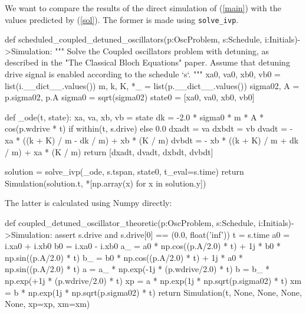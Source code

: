 We want to compare the results of the direct simulation of (\ref{main}) with the values predicted by
(\ref{sol}). The former is made using \verb|solve_ivp|.

  \begin{python}
  def scheduled_coupled_detuned_oscillators(p:OscProblem, s:Schedule, i:Initials)->Simulation:
    """ Solve the Coupled oscillators problem with detuning, as described in the "The Classical Bloch
    Equations" paper. Assume that detuning drive signal is enabled according to the schedule `s`.
    """
    xa0, va0, xb0, vb0 = list(i.__dict__.values())
    m, k, K, *_ = list(p.__dict__.values())
    sigma02, A = p.sigma02, p.A
    sigma0 = sqrt(sigma02)
    state0 = [xa0, va0, xb0, vb0]
  
    def _ode(t, state):
      xa, va, xb, vb = state
      dk = -2.0 * sigma0 * m * A * cos(p.wdrive * t) if within(t, s.drive) else 0.0
      dxadt = va
      dxbdt = vb
      dvadt = - xa * ((k + K) / m - dk / m) + xb * (K / m)
      dvbdt = - xb * ((k + K) / m + dk / m) + xa * (K / m)
      return [dxadt, dvadt, dxbdt, dvbdt]
  
    solution = solve_ivp(_ode, s.tspan, state0, t_eval=s.time)
    return Simulation(solution.t, *[np.array(x) for x in solution.y])
  \end{python}

The latter is calculated using Numpy directly:

  \begin{comment}
    \begin{sh}
    printf '\\begin{%
    cat $PROJECT_ROOT/python/mechanical_bloch.py | sedlines.sh coupled_detuned_oscillator_theoretic
    printf '\\end{%
    \end{sh}
  \end{comment}

  \begin{python}
  def coupled_detuned_oscillator_theoretic(p:OscProblem, s:Schedule, i:Initials)->Simulation:
    assert s.drive and s.drive[0] == (0.0, float('inf'))
    t = s.time
    a0 = i.xa0 + i.xb0
    b0 = i.xa0 - i.xb0
    a_ = a0 * np.cos((p.A/2.0) * t) + 1j * b0 * np.sin((p.A/2.0) * t)
    b_ = b0 * np.cos((p.A/2.0) * t) + 1j * a0 * np.sin((p.A/2.0) * t)
    a = a_ * np.exp(-1j * (p.wdrive/2.0) * t)
    b = b_ * np.exp(+1j * (p.wdrive/2.0) * t)
    xp = a * np.exp(1j * np.sqrt(p.sigma02) * t)
    xm = b * np.exp(1j * np.sqrt(p.sigma02) * t)
    return Simulation(t, None, None, None, None, xp=xp, xm=xm)
  \end{python}


